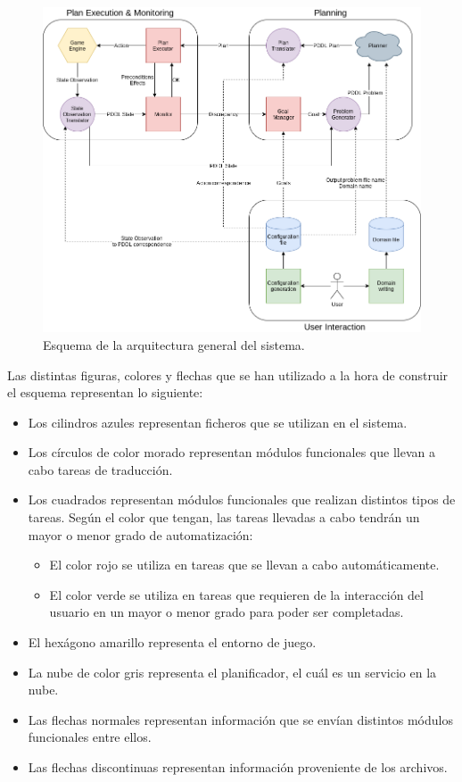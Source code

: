 \begin{figure}[H]
    \centering
    \includegraphics[scale=0.4]{img/CH04/system_arch.png}
    \caption{Esquema de la arquitectura general del sistema.}
    \label{fig:system_arch}
\end{figure}

Las distintas figuras, colores y flechas que se han utilizado a la hora de construir el
esquema representan lo siguiente:

\begin{itemize}[label=\textbullet]
    \item Los cilindros azules representan ficheros que se utilizan en el sistema.
    \item Los círculos de color morado representan módulos funcionales que llevan a cabo
    tareas de traducción.
    \item Los cuadrados representan módulos funcionales que realizan distintos tipos de
    tareas. Según el color que tengan, las tareas llevadas a cabo tendrán un mayor o menor
    grado de automatización:
    \begin{itemize}[label=\textendash]
        \item El color rojo se utiliza en tareas que se llevan a cabo automáticamente.
        \item El color verde se utiliza en tareas que requieren de la interacción del usuario
        en un mayor o menor grado para poder ser completadas.
    \end{itemize}
    \item El hexágono amarillo representa el entorno de juego.
    \item La nube de color gris representa el planificador, el cuál es un servicio en la
    nube.
    \item Las flechas normales representan información que se envían distintos módulos
    funcionales entre ellos.
    \item Las flechas discontinuas representan información proveniente de los archivos.
\end{itemize}

